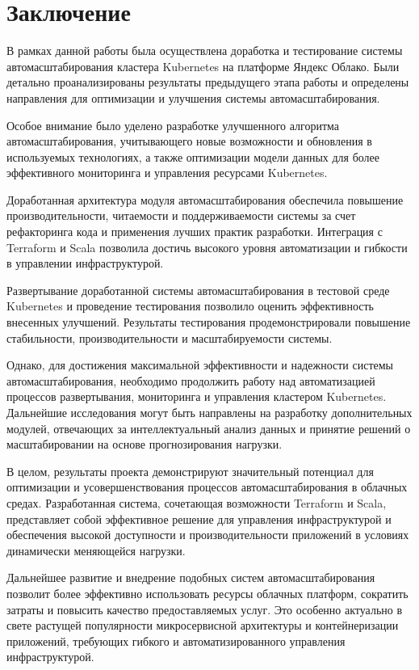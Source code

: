 \chapter*{Заключение}

В рамках данной работы была осуществлена доработка и
тестирование системы автомасштабирования кластера Kubernetes на платформе Яндекс
Облако. Были детально проанализированы результаты предыдущего этапа работы и
определены направления для оптимизации и улучшения системы автомасштабирования.

Особое внимание было уделено разработке улучшенного алгоритма
автомасштабирования, учитывающего новые возможности и обновления в используемых
технологиях, а также оптимизации модели данных для более эффективного
мониторинга и управления ресурсами Kubernetes.

Доработанная архитектура модуля автомасштабирования обеспечила повышение
производительности, читаемости и поддерживаемости системы за счет рефакторинга
кода и применения лучших практик разработки. Интеграция с Terraform и Scala
позволила достичь высокого уровня автоматизации и гибкости в управлении
инфраструктурой.

Развертывание доработанной системы автомасштабирования в тестовой среде
Kubernetes и проведение тестирования позволило оценить эффективность внесенных
улучшений. Результаты тестирования продемонстрировали повышение стабильности,
производительности и масштабируемости системы.

Однако, для достижения максимальной эффективности и надежности системы
автомасштабирования, необходимо продолжить работу над автоматизацией процессов
развертывания, мониторинга и управления кластером Kubernetes. Дальнейшие
исследования могут быть направлены на разработку дополнительных модулей,
отвечающих за интеллектуальный анализ данных и принятие решений о
масштабировании на основе прогнозирования нагрузки.

В целом, результаты проекта демонстрируют значительный потенциал для оптимизации
и усовершенствования процессов автомасштабирования в облачных средах.
Разработанная система, сочетающая возможности Terraform и Scala, представляет
собой эффективное решение для управления инфраструктурой и обеспечения высокой
доступности и производительности приложений в условиях динамически меняющейся
нагрузки.

Дальнейшее развитие и внедрение подобных систем автомасштабирования позволит
более эффективно использовать ресурсы облачных платформ, сократить
затраты и повысить качество предоставляемых услуг. Это особенно актуально в
свете растущей популярности микросервисной архитектуры и контейнеризации
приложений, требующих гибкого и автоматизированного управления инфраструктурой.